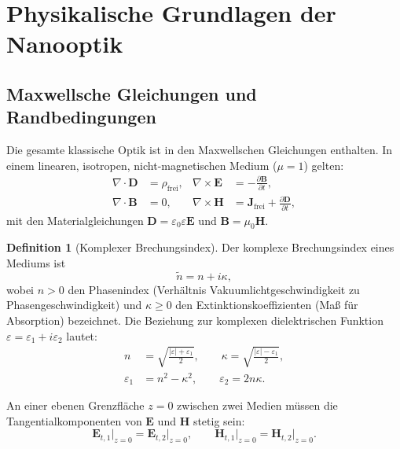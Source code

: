 ﻿\documentclass[a4paper,12pt]{article}
\theoremstyle{definition}
\newtheorem{definition}{Definition}[section]
\newcommand{\vect}[1]{\bm{#1}}
\begin{document}
	\section{Physikalische Grundlagen der Nanooptik}
	\label{sec:grundlagen}
	
	\subsection{Maxwellsche Gleichungen und Randbedingungen}
	
	Die gesamte klassische Optik ist in den Maxwellschen Gleichungen enthalten.
	In einem linearen, isotropen, nicht-magnetischen Medium ($\mu = 1$) gelten:
	\begin{align}
		\nabla \cdot \vect{D} &= \rho_\mathrm{frei}, &
		\nabla \times \vect{E} &= -\frac{\partial \vect{B}}{\partial t}, \label{eq:maxwell1}\\
		\nabla \cdot \vect{B} &= 0, &
		\nabla \times \vect{H} &= \vect{J}_\mathrm{frei} + \frac{\partial \vect{D}}{\partial t},
		\label{eq:maxwell2}
	\end{align}
	mit den Materialgleichungen $\vect{D} = \varepsilon_0 \varepsilon \vect{E}$
	und $\vect{B} = \mu_0 \vect{H}$.
	
	\begin{definition}[Komplexer Brechungsindex]
		\label{def:brechungsindex}
		Der komplexe Brechungsindex eines Mediums ist
		\[
		\tilde{n} = n + i\kappa,
		\]
		wobei $n > 0$ den Phasenindex (Verhältnis Vakuumlichtgeschwindigkeit zu
		Phasengeschwindigkeit) und $\kappa \geq 0$ den Extinktionskoeffizienten
		(Maß für Absorption) bezeichnet. Die Beziehung zur komplexen dielektrischen
		Funktion $\varepsilon = \varepsilon_1 + i\varepsilon_2$ lautet:
		\begin{align}
			n &= \sqrt{\frac{|\varepsilon| + \varepsilon_1}{2}}, \qquad
			\kappa = \sqrt{\frac{|\varepsilon| - \varepsilon_1}{2}},\\
			\varepsilon_1 &= n^2 - \kappa^2, \qquad
			\varepsilon_2 = 2n\kappa.
		\end{align}
	\end{definition}
	
	An einer ebenen Grenzfläche $z = 0$ zwischen zwei Medien
	müssen die Tangentialkomponenten von $\vect{E}$ und $\vect{H}$ stetig sein:
	\begin{equation}
		\vect{E}_{t,1}\big|_{z=0} = \vect{E}_{t,2}\big|_{z=0}, \qquad
		\vect{H}_{t,1}\big|_{z=0} = \vect{H}_{t,2}\big|_{z=0}.
	\end{equation}
	
\end{document}
